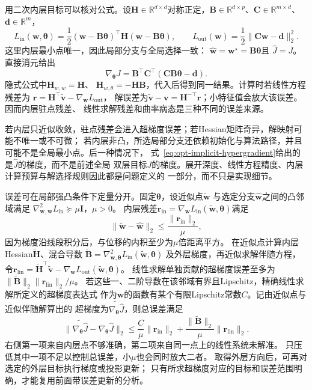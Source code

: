 用二次内层目标可以核对公式。设$\bm H\in\mathbb R^{d\times d}$对称正定，$\bm B\in\mathbb R^{d\times p}$、$\bm C\in\mathbb R^{m\times d}$、$\bm d\in\mathbb R^m$，
\[
  L_{\mathrm{in}}(\bm{w},\bm{\theta})
  =\frac12(\bm{w}-\bm{B}\bm{\theta})^{\top}
  \bm{H}(\bm{w}-\bm{B}\bm{\theta}),\qquad
  L_{\mathrm{out}}(\bm{w})
  =\frac12\lVert\bm{C}\bm{w}-\bm{d}\rVert_2^2.
\]
这里内层最小点唯一，因此局部分支与全局选择一致：
$\widehat{\bm{w}}=\bm{w}^{\star}=\bm{B}\bm{\theta}$且
$\widehat{J}=J$。直接消元给出
\[
  \nabla_{\bm{\theta}}J
  =\bm{B}^{\top}\bm{C}^{\top}
  (\bm{C}\bm{B}\bm{\theta}-\bm{d}).
\]
隐式公式中$\bm{H}_{w,w}=\bm{H}$、
$\bm{H}_{w,\theta}=-\bm{H}\bm{B}$，代入后得到同一结果。计算时若线性方程残差为
$\bm r=\bm H^\top\widetilde{\bm v}-\nabla_{\bm w}L_{\mathrm{out}}$，
解误差为$\widetilde{\bm v}-\bm v=\bm{H}^{-\top}\bm{r}$；小特征值会放大该误差。因而内层驻点残差、
线性求解残差和曲率病态是三种不同的误差来源。

若内层只近似收敛，驻点残差会进入超梯度误差；若Hessian矩阵奇异，解映射可能不唯一或不可微；
若内层非凸，所选局部分支还依赖初始化与算法路径，并且可能不是全局最小点。后一种情况下，
式~\eqref{eq:opt-implicit-hypergradient}给出的是$\widehat{J}$的梯度，而不是前述全局
双层目标$J$的梯度。展开深度、线性方程精度、内层计算预算与解选择规则因此都是问题定义的
一部分，而不只是实现细节。

误差可在局部强凸条件下定量分开。固定$\bm\theta$，设近似点$\widetilde{\bm w}$
与选定分支$\widehat{\bm w}$之间的凸邻域满足
$\nabla_{\bm w,\bm w}^2L_{\mathrm{in}}\succeq\mu\bm I$，$\mu>0$。
内层残差$\bm r_{\mathrm{in}}=\nabla_{\bm w}L_{\mathrm{in}}(\widetilde{\bm w},\bm\theta)$满足
\[
 \|\widetilde{\bm w}-\widehat{\bm w}\|_2
 \leq\frac{\|\bm r_{\mathrm{in}}\|_2}{\mu},
\]
因为梯度沿线段积分后，与位移的内积至少为$\mu$倍距离平方。
在近似点计算内层Hessian$\widetilde{\bm H}$、混合导数
$\widetilde{\bm B}=\nabla_{\bm w,\bm\theta}^2L_{\mathrm{in}}(\widetilde{\bm w},\bm\theta)$
及外层梯度，再近似求解伴随方程，
令$\bm r_{\mathrm{lin}}=\widetilde{\bm H}^{\top}\widetilde{\bm v}
-\nabla_{\bm w}L_{\mathrm{out}}(\widetilde{\bm w},\bm\theta)$。
线性求解单独贡献的超梯度误差至多为
$\|\widetilde{\bm B}\|_2\|\bm r_{\mathrm{lin}}\|_2/\mu$。
若这些一、二阶导数在该邻域有界且Lipschitz，精确线性求解所定义的超梯度表达式
作为$\bm w$的函数有某个有限Lipschitz常数$C$。记由近似点与近似伴随解算出的
超梯度为$\widetilde{\nabla_{\bm\theta}\widehat J}$，则总误差满足
\begin{equation}
 \|\widetilde{\nabla_{\bm\theta}\widehat J}-\nabla_{\bm\theta}\widehat J\|_2
 \leq\frac C\mu\|\bm r_{\mathrm{in}}\|_2
 +\frac{\|\widetilde{\bm B}\|_2}{\mu}\|\bm r_{\mathrm{lin}}\|_2.
 \label{eq:opt-hypergradient-two-residuals}
\end{equation}
右侧第一项来自内层点不够准确，第二项来自同一点上的线性系统未解准。
只压低其中一项不足以控制总误差，小$\mu$也会同时放大二者。
取得外层方向后，可再对选定的外层目标执行梯度或投影更新；
只有所求超梯度对应的目标和误差范围明确，才能复用前面带误差更新的分析。

